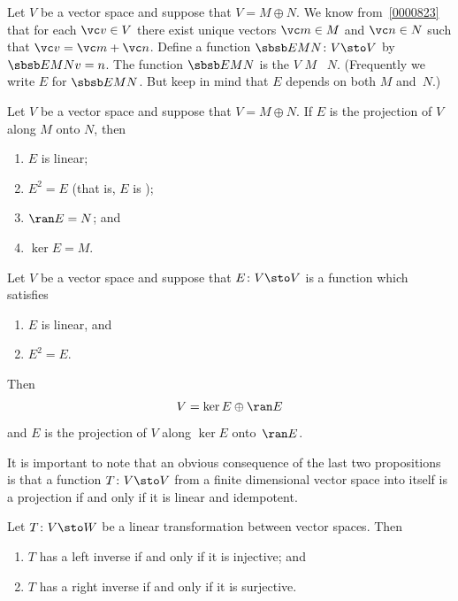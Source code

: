 \begin{defn} Let $V$ be a vector space and suppose that $V = M \oplus N$.  We know
from~\ref{0000823} that for each $\vc v \in V$ there exist unique vectors $\vc m \in M$
and $\vc n \in N$ such that $\vc v = \vc m + \vc n$.  Define a function $\sbsb E{MN}\colon V \sto V$ by $\sbsb E{MN}v = n$.
The function $\sbsb E{MN}$ is the
 $V$  $M$ ~$N$.  (Frequently we write $E$ for $\sbsb E{MN}$. But keep in mind that
$E$ depends on both $M$ and~$N$.)
\end{defn}

\begin{prop} Let $V$ be a vector space and suppose that $V = M \oplus N$. If $E$ is the
projection of $V$ along $M$ onto $N$, then
 \begin{enumerate}[label=\rm{(\alph*)}]
  \item $E$ is linear;
  \item $E^2 = E$ \quad (that is, $E$ is );
  \item $\ran E = N$; and
  \item $\ker E = M$.
 \end{enumerate}
\end{prop}

\begin{prop} Let $V$ be a vector space and suppose that $E\colon V \sto V$ is a function which
satisfies
 \begin{enumerate}[label=\rm{(\alph*)}]
  \item $E$ is linear, and
  \item $E^2 = E$.
\end{enumerate}
Then
 \[V = \ker E \oplus \ran E\]
and $E$ is the projection of $V$ along $\ker E$ onto~$\ran E$.
\end{prop}

It is important to note that an obvious consequence of the last two propositions is that
a function $T\colon V \sto V$ from a finite dimensional vector space into itself is a
projection if and only if it is linear and idempotent.







\begin{prop} Let $T\colon V \sto W$ be a linear transformation between vector spaces. Then
  \begin{enumerate}[label=\rm{(\alph*)}]
    \item $T$ has a left inverse if and only if it is injective; and
    \item $T$ has a right inverse if and only if it is surjective.
  \end{enumerate}
\end{prop}














